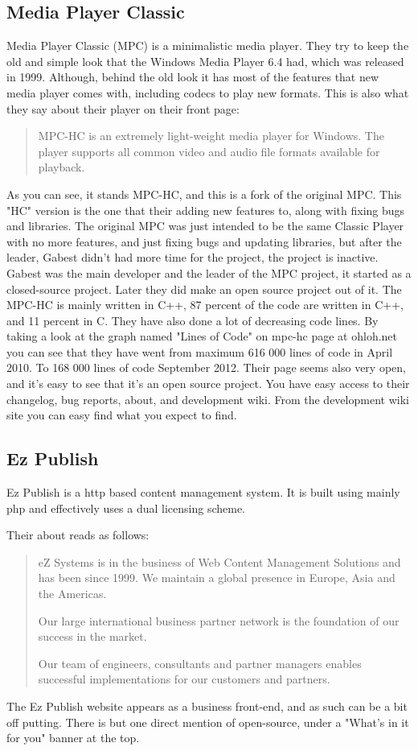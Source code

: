 \documentclass{report} %
\begin{document}
\subsection{Media Player Classic}
Media Player Classic (MPC) is a minimalistic media player. They try to keep the old and simple look that the Windows Media Player 6.4 had, which was released in 1999. Although, behind the old look it has most of the features that new media player comes with, including codecs to play new formats. 
This is also what they say about their player on their front page:
\begin{quote}
MPC-HC is an extremely light-weight media player for Windows.
The player supports all common video and audio file formats available for playback.\cite{mpcweb}
\end{quote}
As you can see, it stands MPC-HC, and this is a fork of the original MPC. This "HC" version is the one that their adding new features to, along with fixing bugs and libraries. The original MPC was just intended to be the same Classic Player with no more features, and just fixing bugs and updating libraries, but after the leader, Gabest didn't had more time for the project, the project is inactive. %
Gabest was the main developer and the leader of the MPC project, it started as a closed-source project. Later they did make an open source project out of it.
The MPC-HC is mainly written in C++, 87 percent of the code are written in C++, and 11 percent in C\cite{ohlohmpc}. They have also done a lot of decreasing code lines. By taking a look at the graph named "Lines of Code" on mpc-hc page at ohloh.net\cite{ohlohmpc} you can see that they have went from maximum 616 000 lines of code in April 2010. To 168 000 lines of code September 2012.
Their page seems also very open, and it's easy to see that it's an open source project. You have easy access to their changelog, bug reports, about, and development wiki. From the development wiki site you can easy find what you expect to find.
 
\subsection{Ez Publish}
Ez Publish is a http based content management system. It is built using mainly php and effectively uses a dual licensing scheme.

Their about reads as follows:
\begin{quote}
eZ Systems is in the business of Web Content Management Solutions and has been since 1999. We maintain a global presence in Europe, Asia and the Americas. 

Our large international business partner network is the foundation of our success in the market. 

Our team of engineers, consultants and partner managers enables successful implementations for our customers and partners.\cite{ezpubwebabout}
\end{quote}
The Ez Publish website\cite{ezpubweb} appears as a business front-end, and as such can be a bit off putting. There is but one direct mention of open-source, under a "What's in it for you" banner at the top.
\end{document}

